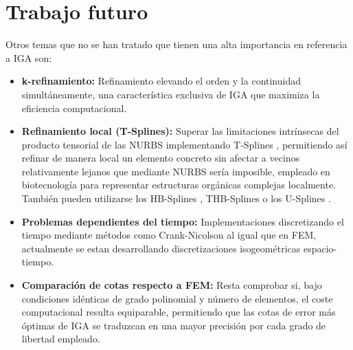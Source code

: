 \documentclass[11pt]{book}
\theoremstyle{plain} %
\theoremstyle{definition} %
\theoremstyle{definition} %
\begin{document}
\section{Trabajo futuro}
\vspace{-0.1cm}

Otros temas que no se han tratado que tienen una alta importancia en referencia a IGA son:
\vspace{-0.2cm}

\begin{itemize}
    \item \textbf{k-refinamiento:} Refinamiento elevando el orden y la continuidad simultáneamente, una característica exclusiva de IGA que maximiza la eficiencia computacional.
    
    \vspace{-0.2cm}

    
    \item \textbf{Refinamiento local (T-Splines):} Superar las limitaciones intrínsecas del producto tensorial de las NURBS implementando T-Splines \cite{bazilevs_isogeometric_2010}, permitiendo así refinar de manera local un elemento concreto sin afectar a vecinos relativamente lejanos que mediante NURBS sería imposible, empleado en biotecnología para representar estructuras orgánicas complejas localmente. También pueden utilizarse
    los HB-Splines \cite{a_hierarchical_2011}, THB-Splines \cite{giannelli_thb-splines_2012} o los U-Splines \cite{coreform_llc_coreform_2025}.
    
    \vspace{-0.2cm}

    \item \textbf{Problemas dependientes del tiempo:} Implementaciones discretizando el tiempo mediante métodos como Crank-Nicolson al igual que en FEM, actualmente se estan desarrollando discretizaciones isogeométricas espacio-tiempo.
    
    \vspace{-0.2cm}

    \item \textbf{Comparación de cotas respecto a FEM:} Resta comprobar si, bajo condiciones idénticas de grado polinomial y número de elementos, el coste computacional resulta equiparable, permitiendo que las cotas de error más óptimas de IGA se traduzcan en una mayor precisión por cada grado de libertad empleado.
\end{itemize}
\backmatter                      %
\end{document}
